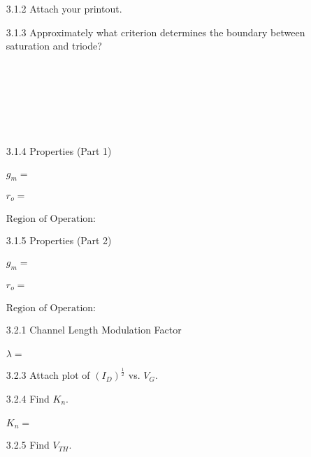 \documentclass{article}
\begin{document}
\thispagestyle{plain}

\name

\begin{enumerate}
\item[3.1.2] Attach your printout.
\item[3.1.3] Approximately what criterion determines the boundary between saturation and triode?
  ~\\~\\~\\~\\~\\~\\~\\
\item[3.1.4] Properties (Part 1) \\ ~ \\
  $\boxed{g_m	= ~~~~~~~~~~~~~~~~~~~~~~~}$ \\ ~ \\
  $\boxed{r_o	= ~~~~~~~~~~~~~~~~~~~~~~~}$ \\ ~ \\
  $\boxed{\text{Region of Operation:} ~~~~~~~~~~~~~~~~~~~~}$
\item[3.1.5] Properties (Part 2) \\ ~ \\
  $\boxed{g_m	= ~~~~~~~~~~~~~~~~~~~~~~~}$ \\ ~ \\
  $\boxed{r_o	= ~~~~~~~~~~~~~~~~~~~~~~~}$ \\ ~ \\
  $\boxed{\text{Region of Operation:} ~~~~~~~~~~~~~~~~~~~~}$
\item[3.2.1] Channel Length Modulation Factor \\ ~ \\
	$\boxed{\lambda	= ~~~~~~~~~~~~~~~~~~~~~~~}$
\item[3.2.3] Attach plot of $(I_{D})^{\frac{1}{2}}$ vs. $V_G$.
\item[3.2.4] Find $K_n$. \\ ~ \\
  $\boxed{K_n	= ~~~~~~~~~~~~~~~~~~~~~~~}$
\item[3.2.5] Find $V_{TH}$. \\ ~ \\

\end{enumerate}
\end{document}
